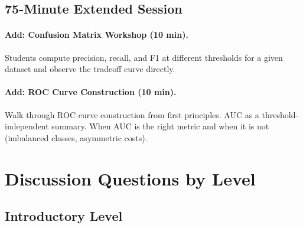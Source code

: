 \subsection{75-Minute Extended Session}

\paragraph{Add: Confusion Matrix Workshop (10 min).}
Students compute precision, recall, and F1 at different thresholds for a given dataset and observe the tradeoff curve directly.

\paragraph{Add: ROC Curve Construction (10 min).}
Walk through ROC curve construction from first principles. AUC as a threshold-independent summary. When AUC is the right metric and when it is not (imbalanced classes, asymmetric costs).

\section{Discussion Questions by Level}

\subsection{Introductory Level}

